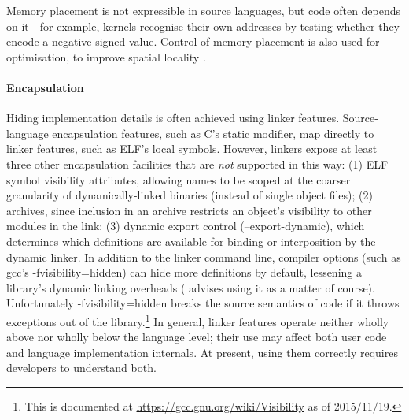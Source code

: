 Memory placement is not expressible in source languages, 
but code often depends on it---for example, kernels recognise their own addresses
by testing whether they encode a negative signed value.
Control of memory placement is also used for optimisation, 
to improve spatial locality \citep{orr_fast_1993}.


\paragraph{Encapsulation}
Hiding implementation details is often achieved using linker features. 
Source-language encapsulation features, such as C's \textsf{static} modifier, 
map directly to linker features, such as ELF's local symbols.
However, linkers expose at least three other encapsulation facilities
that are \emph{not} supported in this way: (1) ELF symbol visibility attributes,
allowing names to be scoped at the coarser granularity of 
dynamically-linked binaries (instead of single object files);
(2) archives,
since inclusion in an archive restricts an object's visibility 
to other modules in the link;
(3) dynamic export control (\textsf{--export-dynamic}), which determines 
which definitions are available for binding or interposition by the dynamic linker.
In addition to the linker command line, 
compiler options (such as \textsf{gcc}'s \textsf{-fvisibility=hidden})
can hide more definitions by default, lessening a library's dynamic linking overheads
(\citet{drepper_how_2011} advises using it as a matter of course).
Unfortunately \textsf{-fvisibility=hidden} breaks the source semantics of \Cplusplus{} code 
if it throws exceptions out of the library.\footnote{This is documented at \url{https://gcc.gnu.org/wiki/Visibility}
as of 2015$/$11$/$19.}
In general, linker features operate neither wholly above nor wholly below the language level; 
their use may affect both user code and language implementation internals.
At present, using them correctly requires developers to understand both.

